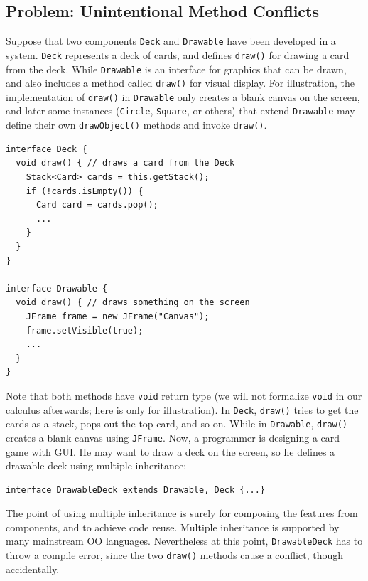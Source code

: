\subsection{Problem: Unintentional Method Conflicts}

Suppose that two components \lstinline|Deck| and \lstinline|Drawable| 
have been developed in a system.  \lstinline|Deck| represents a deck
of cards, and defines \lstinline|draw()| for drawing a card from the
deck.  While \lstinline|Drawable| is an interface for graphics that
can be drawn, and also includes a method called \lstinline|draw()| for
visual display. For illustration, the implementation of
\lstinline|draw()| in \lstinline|Drawable| only creates a blank canvas
on the screen, and later some instances (\lstinline|Circle|,
\lstinline|Square|, or others) that extend \lstinline|Drawable| may
define their own \lstinline|drawObject()| methods and invoke
\lstinline|draw()|.

\vspace{3pt}\begin{lstlisting}
interface Deck {
  void draw() { // draws a card from the Deck
    Stack<Card> cards = this.getStack();
    if (!cards.isEmpty()) {
      Card card = cards.pop();
      ...
    }
  }
}

interface Drawable {
  void draw() { // draws something on the screen
    JFrame frame = new JFrame("Canvas");
    frame.setVisible(true);
    ...
  }
}
\end{lstlisting}\vspace{3pt}
Note that both methods have \lstinline|void| return type (we will not formalize
\lstinline|void| in our calculus afterwards; here is only for illustration). In \lstinline|Deck|, \lstinline|draw()| tries to get the cards as a stack, pops
out the top card, and so on. While in \lstinline|Drawable|, \lstinline|draw()|
creates a blank canvas using \lstinline|JFrame|. Now, a programmer is designing a
card game with GUI. He may want to draw a deck on the screen, so he defines a drawable
deck using multiple inheritance:

\vspace{3pt}\begin{lstlisting}
interface DrawableDeck extends Drawable, Deck {...} 
\end{lstlisting}\vspace{3pt}
The point of using multiple inheritance is surely for composing the features from
components, and to achieve code reuse. Multiple inheritance is supported by many mainstream OO
languages. Nevertheless at this point, \lstinline|DrawableDeck| has to throw a compile
error, since the two \lstinline|draw()| methods cause a conflict, though accidentally.

